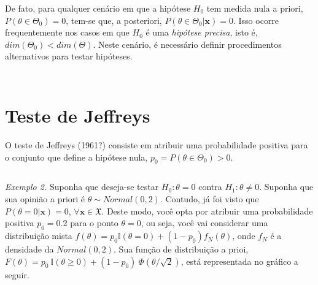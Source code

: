 \documentclass[
]{book}
\begin{document}
De fato, para qualquer cenário em que a hipótese \(H_0\) tem medida nula a priori, \(P(\theta \in \Theta_0)=0\), tem-se que, a posteriori, \(P(\theta \in \Theta_0|\boldsymbol x)=0\). Isso ocorre frequentemente nos casos em que \(H_0\) é uma \emph{hipótese precisa}, isto é, \(dim(\Theta_0)<dim(\Theta)\). Neste cenário, é necessário definir procedimentos alternativos para testar hipóteses.

\(~\)

\(~\)

\hypertarget{teste-de-jeffreys}{%
\section{Teste de Jeffreys}\label{teste-de-jeffreys}}

O teste de Jeffreys (1961?) consiste em atribuir uma probabilidade positiva para o conjunto que define a hipótese nula, \(p_0=P(\theta \in \Theta_0)>0\).

\(~\)

\emph{Exemplo 2.} Suponha que deseja-se testar \(H_0: \theta=0\) contra \(H_1: \theta\neq 0\). Suponha que sua opinião a priori é \(\theta \sim Normal(0,2)\). Contudo, já foi visto que \(P(\theta=0|\boldsymbol x)=0\), \(\forall \boldsymbol x \in \mathfrak{X}\). Deste modo, você opta por atribuir uma probabilidade positiva \(p_0=0.2\) para o ponto \(\theta=0\), ou seja, você vai considerar uma distribuição mista \(f(\theta)=p_0\mathbb{I}(\theta=0)+(1-p_0)f_N(\theta)\), onde \(f_N\) é a densidade da \(Normal(0,2)\). Sua função de distribuição a prioi, \(F(\theta)=p_0~\mathbb{I}(\theta\geq0)+(1-p_0)~\Phi\left(\theta/\sqrt{2}\right)\), está representada no gráfico a seguir.
\end{document}
